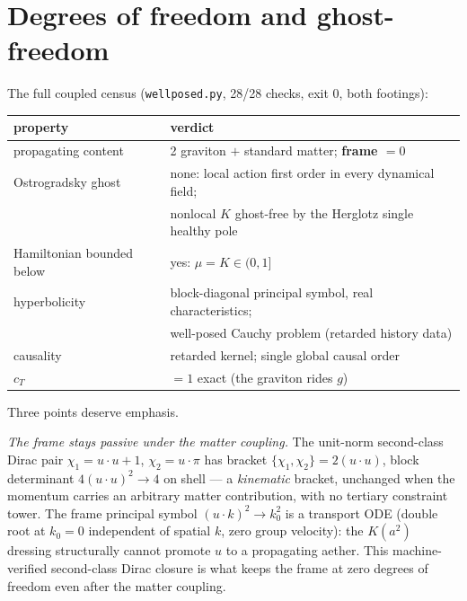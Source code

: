 \documentclass[11pt]{article}
\begin{document}
\section{Degrees of freedom and ghost-freedom}\label{sec:dof}

The full coupled census (\texttt{wellposed.py}, 28/28 checks, exit 0, both footings):
\begin{center}
\begin{tabular}{ll}
\toprule
property & verdict\\
\midrule
propagating content & 2 graviton $+$ standard matter; \textbf{frame $=0$}\\
Ostrogradsky ghost & none: local action first order in every dynamical field;\\
& nonlocal $K$ ghost-free by the Herglotz single healthy pole\\
Hamiltonian bounded below & yes: $\mu=K\in(0,1]$\\
hyperbolicity & block-diagonal principal symbol, real characteristics;\\
& well-posed Cauchy problem (retarded history data)\\
causality & retarded kernel; single global causal order\\
$c_T$ & $=1$ exact (the graviton rides $g$)\\
\bottomrule
\end{tabular}
\end{center}

Three points deserve emphasis.

\emph{The frame stays passive under the matter coupling.} The unit-norm second-class Dirac pair $\chi_1=u\cdot u+1$, $\chi_2=u\cdot\pi$ has bracket $\{\chi_1,\chi_2\}=2(u\cdot u)$, block determinant $4(u\cdot u)^2\to4$ on shell --- a \emph{kinematic} bracket, unchanged when the momentum carries an arbitrary matter contribution, with no tertiary constraint tower. The frame principal symbol $(u\cdot k)^2\to k_0^2$ is a transport ODE (double root at $k_0=0$ independent of spatial $k$, zero group velocity): the $K(a^2)$ dressing structurally cannot promote $u$ to a propagating aether. This machine-verified second-class Dirac closure is what keeps the frame at zero degrees of freedom even after the matter coupling.
\end{document}
